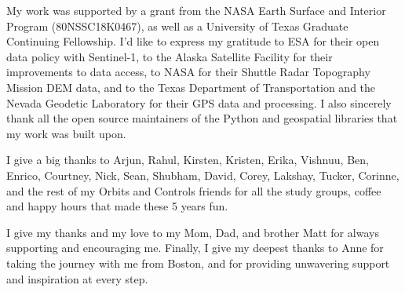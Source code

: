\documentclass{utexasthesis}
\begin{document}
\begin{acknowledgments}
My work was supported by a grant from the NASA Earth Surface and Interior Program (80NSSC18K0467), as well as a University of Texas Graduate Continuing Fellowship. I'd like to express my gratitude to ESA for their open data policy with Sentinel-1, to the Alaska Satellite Facility for their improvements to data access, to NASA for their Shuttle Radar Topography Mission DEM data, and to the Texas Department of Transportation and the Nevada Geodetic Laboratory for their GPS data and processing. I also sincerely thank all the open source maintainers of the Python and geospatial libraries that my work was built upon.


I give a big thanks to Arjun, Rahul, Kirsten, Kristen, Erika, Vishnuu, Ben, Enrico, Courtney, Nick, Sean, Shubham, David, Corey, Lakshay, Tucker, Corinne, and the rest of my Orbits and Controls friends for all the study groups, coffee and happy hours that made these 5 years fun.

I give my thanks and my love to my Mom, Dad, and brother Matt for always supporting and encouraging me. Finally, I give my deepest thanks to Anne for taking the journey with me from Boston, and for providing unwavering support and inspiration at every step.

\end{acknowledgments}
\end{document}
